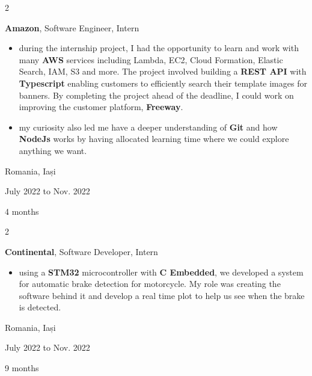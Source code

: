 \documentclass[10pt, letterpaper]{article}
\newenvironment{highlights}{
    \begin{itemize}[
        topsep=0.10 cm,
        parsep=0.10 cm,
        partopsep=0pt,
        itemsep=0pt,
        leftmargin=0.4 cm + 10pt
    ]
}{
    \end{itemize}
} %
\newenvironment{twocolentry}[2][]{
    \onecolentry
    \def\secondColumn{#2}
    \setcolumnwidth{\fill, 4.5 cm}
    \begin{paracol}{2}
}{
    \switchcolumn \raggedleft \secondColumn
    \end{paracol}
    \endonecolentry
} %
\begin{document}
        
        
        \vspace{0.2 cm}



        \begin{twocolentry}{
            Romania, Iași

            July 2022 to Nov. 2022

            4 months
        }
            \textbf{Amazon}, Software Engineer, Intern
            \begin{highlights}
                \item during the internship project, I had the opportunity to learn and work
                with many \textbf{AWS} services including Lambda, EC2, Cloud Formation, Elastic Search, IAM, S3 and more. The project involved building a \textbf{REST API}
                with \textbf{Typescript} enabling customers to efficiently search
                their template images for banners.
                By completing the project ahead of the deadline, I could work on improving the customer platform, \textbf{Freeway}.

                \item my curiosity also led me have a deeper understanding of \textbf{Git} and how \textbf{NodeJs} works by having
                allocated learning time where we could explore anything we want.
                
            \end{highlights}
        \end{twocolentry}


    

        \vspace{0.2 cm}




        \begin{twocolentry}{
            Romania, Iași

            July 2022 to Nov. 2022

            9 months 
        }
            \textbf{Continental}, Software Developer, Intern
            \begin{highlights}
                \item using a \textbf{STM32} microcontroller with \textbf{C Embedded}, we developed a system for automatic brake detection for motorcycle. 
                My role was creating the software behind it and develop a real time plot to help us see when the brake is detected.
            \end{highlights}
        \end{twocolentry}
\end{document}
